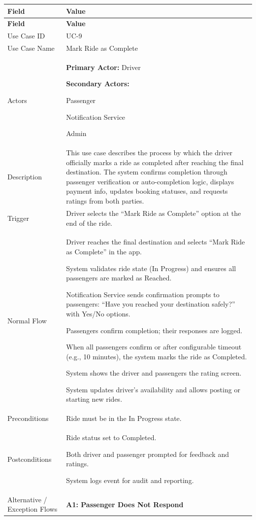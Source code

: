 \begin{longtable}{|p{3.5cm}|p{12cm}|}
\hline
\rowcolor{lightgray!30}
\textbf{Field} & \textbf{Value} \\
\hline
\endfirsthead
\hline
\rowcolor{lightgray!30}
\textbf{Field} & \textbf{Value} \\
\hline
\endhead
\hline
\endfoot
Use Case ID & UC-9 \\
\hline
Use Case Name & Mark Ride as Complete \\
\hline
Actors &
\textbf{Primary Actor:} Driver

\textbf{Secondary Actors:}

Passenger

Notification Service

Admin \\
\hline
Description &
This use case describes the process by which the driver officially marks a ride as completed after reaching the final destination. The system confirms completion through passenger verification or auto-completion logic, displays payment info, updates booking statuses, and requests ratings from both parties. \\
\hline
Trigger &
Driver selects the “Mark Ride as Complete” option at the end of the ride. \\
\hline
Normal Flow &
Driver reaches the final destination and selects “Mark Ride as Complete” in the app.

System validates ride state (In Progress) and ensures all passengers are marked as Reached.

Notification Service sends confirmation prompts to passengers: “Have you reached your destination safely?” with Yes/No options.

Passengers confirm completion; their responses are logged.

When all passengers confirm or after configurable timeout (e.g., 10 minutes), the system marks the ride as Completed.

System shows the driver and passengers the rating screen.

System updates driver’s availability and allows posting or starting new rides. \\
\hline
Preconditions &
Ride must be in the In Progress state. \\
\hline
Postconditions &
Ride status set to Completed.

Both driver and passenger prompted for feedback and ratings.

System logs event for audit and reporting. \\
\hline
Alternative / Exception Flows &
\textbf{A1: Passenger Does Not Respond}


\end{longtable}
